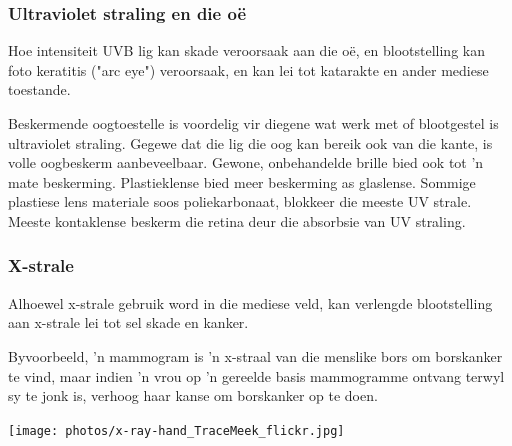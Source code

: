             \subsubsection*{Ultraviolet straling en die o\"e}
            \nopagebreak
        \label{m38779*id189581}Hoe intensiteit UVB lig kan skade veroorsaak aan die o\"e, en blootstelling kan foto keratitis ("arc eye") veroorsaak, en kan lei tot katarakte en ander mediese toestande. \par 
        \label{m38779*id189586}Beskermende oogtoestelle is voordelig vir diegene wat werk met of blootgestel is ultraviolet straling. Gegewe dat die lig die oog kan bereik ook van die kante, is volle oogbeskerm aanbeveelbaar. 
        \label{m38779*id189594} Gewone, onbehandelde brille bied ook tot 'n mate beskerming. Plastieklense bied meer beskerming as glaslense. Sommige plastiese lens materiale soos poliekarbonaat, blokkeer die meeste UV strale. Meeste kontaklense beskerm die retina deur die absorbsie van UV straling. \par 
      \label{m38779*uid22}
      \begin{minipage}{.5\textwidth}
            \subsubsection*{X-strale}
            \nopagebreak
        \label{m38779*id189613}Alhoewel x-strale gebruik word in die mediese veld, kan verlengde blootstelling aan x-strale lei tot sel skade en kanker. \par 
        \label{m38779*id189617} Byvoorbeeld, 'n mammogram is 'n x-straal van die menslike bors om borskanker te vind, maar indien 'n vrou op 'n gereelde basis mammogramme ontvang terwyl sy te jonk is, verhoog haar kanse om borskanker op te doen. \par 
      \label{m38779*uid23}
\end{minipage}
\begin{minipage}{.5\textwidth}\begin{center}
 \texttt{[image: photos/x-ray-hand\_TraceMeek\_flickr.jpg]}\end{center}
\end{minipage}
